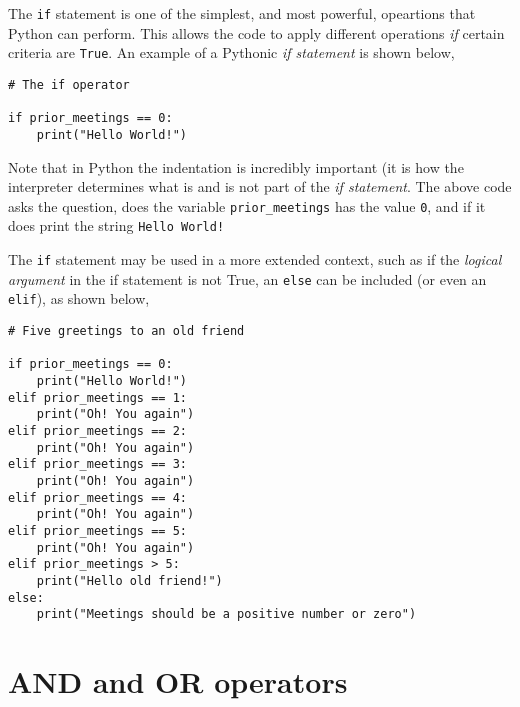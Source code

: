 \documentclass[a4paper]{article}
\begin{document}
The \texttt{if} statement is one of the simplest, and most powerful, opeartions that Python can perform. 
This allows the code to apply different operations \emph{if} certain criteria are \texttt{True}.
An example of a Pythonic \emph{if statement} is shown below, 
\begin{lstlisting}
# The if operator

if prior_meetings == 0:
    print("Hello World!")
\end{lstlisting}
Note that in Python the indentation is incredibly important (it is how the interpreter determines what is and is not part of the \emph{if statement}.
The above code asks the question, does the variable \texttt{prior\_meetings} has the value \texttt{0}, and if it does print the string \texttt{Hello World!}

The \texttt{if} statement may be used in a more extended context, such as if the \emph{logical argument} in the if statement is not True, an \texttt{else} can be included (or even an \texttt{elif}), as shown below,
\begin{lstlisting}
# Five greetings to an old friend

if prior_meetings == 0:
    print("Hello World!")
elif prior_meetings == 1:
    print("Oh! You again")
elif prior_meetings == 2:
    print("Oh! You again")
elif prior_meetings == 3:
    print("Oh! You again")
elif prior_meetings == 4:
    print("Oh! You again")
elif prior_meetings == 5:
    print("Oh! You again")
elif prior_meetings > 5:
	print("Hello old friend!")
else:
	print("Meetings should be a positive number or zero")
\end{lstlisting}

\section{AND and OR operators}
\end{document}
